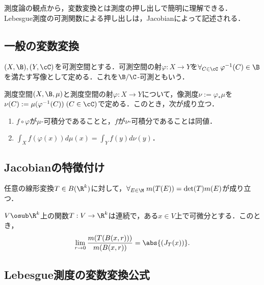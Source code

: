 \documentclass[uplatex, dvipdfmx]{jsreport}
\begin{document}
\begin{tcolorbox}[colframe=ForestGreen, colback=ForestGreen!10!white,breakable,colbacktitle=ForestGreen!40!white,coltitle=black,fonttitle=\bfseries\sffamily,
title=]
    測度論の観点から，変数変換とは測度の押し出しで簡明に理解できる．
    Lebesgue測度の可測関数による押し出しは，Jacobianによって記述される．
\end{tcolorbox}

\subsection{一般の変数変換}

\begin{definition}
    $(X,\B),(Y,\cC)$を可測空間とする．可測空間の射$\varphi:X\to Y$を$\forall_{C\in\cC}\;\varphi^{-1}(C)\in\B$を満たす写像として定める．これを$\B/\C$-可測ともいう．
\end{definition}

\begin{theorem}[変数変換]
    測度空間$(X,\B,\mu)$と測度空間の射$\varphi:X\to Y$について，像測度$\nu:=\varphi_*\mu$を$\nu(C):=\mu(\varphi^{-1}(C))\;(C\in\cC)$で定める．このとき，次が成り立つ．
    \begin{enumerate}
        \item $f\circ\varphi$が$\mu$-可積分であることと，$f$が$\nu$-可積分であることは同値．
        \item $\int_Xf(\varphi(x))d\mu(x)=\int_Yf(y)d\nu(y)$．
    \end{enumerate}
\end{theorem}

\subsection{Jacobianの特徴付け}

\begin{theorem}[Lebesgue測度の性質]
    任意の線形変換$T\in B(\R^k)$に対して，$\forall_{E\in\M}\;m(T(E))=\det(T)m(E)$が成り立つ．
\end{theorem}

\begin{theorem}[Jacobianの特徴付け]
    $V\osub\R^k$上の関数$T:V\to\R^k$は連続で，ある$x\in V$上で可微分とする．このとき，
    \[\lim_{r\to0}\frac{m(T(B(x,r)))}{m(B(x,r))}=\abs{(J_T(x))}.\]
\end{theorem}

\subsection{Lebesgue測度の変数変換公式}
\end{document}
